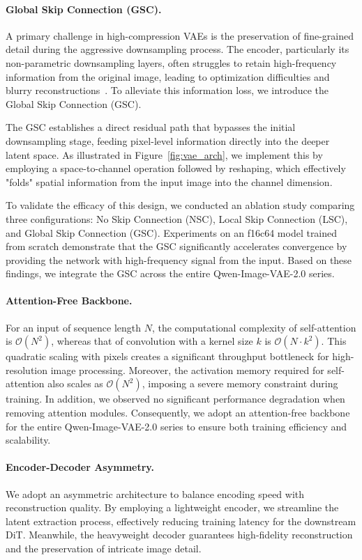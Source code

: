 \paragraph{Global Skip Connection (GSC).}
A primary challenge in high-compression VAEs is the preservation of fine-grained detail during the aggressive downsampling process. The encoder, particularly its non-parametric downsampling layers, often struggles to retain high-frequency information from the original image, leading to optimization difficulties and blurry reconstructions~\citep{dcae}. To alleviate this information loss, we introduce the Global Skip Connection (GSC).

The GSC establishes a direct residual path that bypasses the initial downsampling stage, feeding pixel-level information directly into the deeper latent space. As illustrated in Figure~\ref{fig:vae_arch}, we implement this by employing a space-to-channel operation followed by reshaping, which effectively "folds" spatial information from the input image into the channel dimension.

To validate the efficacy of this design, we conducted an ablation study comparing three configurations: No Skip Connection (NSC), Local Skip Connection (LSC), and Global Skip Connection (GSC). Experiments on an f16c64 model trained from scratch demonstrate that the GSC significantly accelerates convergence by providing the network with high-frequency signal from the input. Based on these findings, we integrate the GSC across the entire Qwen-Image-VAE-2.0 series.



\paragraph{Attention-Free Backbone.} 
For an input of sequence length $N$, the computational complexity of self-attention is $\mathcal{O}(N^2)$, whereas that of convolution with a kernel size $k$ is $\mathcal{O}(N \cdot k^2)$. This quadratic scaling with pixels creates a significant throughput bottleneck for high-resolution image processing. Moreover, the activation memory required for self-attention also scales as $\mathcal{O}(N^2)$, imposing a severe memory constraint during training. In addition, we observed no significant performance degradation when removing attention modules. Consequently, we adopt an attention-free backbone for the entire Qwen-Image-VAE-2.0 series to ensure both training efficiency and scalability.

\paragraph{Encoder-Decoder Asymmetry.} 
We adopt an asymmetric architecture to balance encoding speed with reconstruction quality. By employing a lightweight encoder, we streamline the latent extraction process, effectively reducing training latency for the downstream DiT. Meanwhile, the heavyweight decoder guarantees high-fidelity reconstruction and the preservation of intricate image detail.

